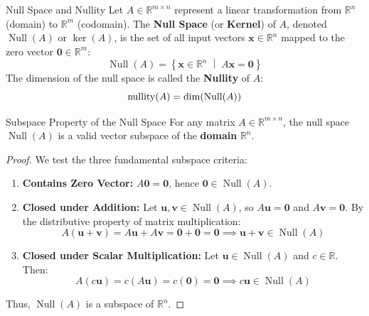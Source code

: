 \begin{definitionbox}{Null Space and Nullity}
 
Let $A \in \mathbb{R}^{m \times n}$ represent a linear transformation from $\mathbb{R}^n$ (domain) to $\mathbb{R}^m$ (codomain). The \textbf{Null Space} (or \textbf{Kernel}) of $A$, denoted $\operatorname{Null}(A)$ or $\ker(A)$, is the set of all input vectors $\mathbf{x} \in \mathbb{R}^n$ mapped to the zero vector $\mathbf{0} \in \mathbb{R}^m$:
\begin{equation}
\operatorname{Null}(A) = \left\{ \mathbf{x} \in \mathbb{R}^n \;\middle|\; A \mathbf{x} = \mathbf{0} \right\}
\end{equation}
The dimension of the null space is called the \textbf{Nullity} of $A$:
\begin{equation}
\operatorname{nullity}(A) = \dim(\operatorname{Null}(A))
\end{equation}
\end{definitionbox}

\begin{theorembox}{Subspace Property of the Null Space}
For any matrix $A \in \mathbb{R}^{m \times n}$, the null space $\operatorname{Null}(A)$ is a valid vector subspace of the \textbf{domain} $\mathbb{R}^n$.
\end{theorembox}

\begin{proof}
We test the three fundamental subspace criteria:
\begin{enumerate}
    \item \textbf{Contains Zero Vector:} $A \mathbf{0} = \mathbf{0}$, hence $\mathbf{0} \in \operatorname{Null}(A)$.
    \item \textbf{Closed under Addition:} Let $\mathbf{u}, \mathbf{v} \in \operatorname{Null}(A)$, so $A\mathbf{u} = \mathbf{0}$ and $A\mathbf{v} = \mathbf{0}$. By the distributive property of matrix multiplication:
    \begin{equation*}
    A(\mathbf{u} + \mathbf{v}) = A\mathbf{u} + A\mathbf{v} = \mathbf{0} + \mathbf{0} = \mathbf{0} \implies \mathbf{u} + \mathbf{v} \in \operatorname{Null}(A)
    \end{equation*}
    \item \textbf{Closed under Scalar Multiplication:} Let $\mathbf{u} \in \operatorname{Null}(A)$ and $c \in \mathbb{R}$. Then:
    \begin{equation*}
    A(c\mathbf{u}) = c(A\mathbf{u}) = c(\mathbf{0}) = \mathbf{0} \implies c\mathbf{u} \in \operatorname{Null}(A)
    \end{equation*}
\end{enumerate}
Thus, $\operatorname{Null}(A)$ is a subspace of $\mathbb{R}^n$.
\end{proof}

